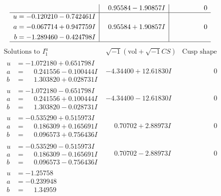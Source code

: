 \documentclass[1p]{elsarticle_modified}
\theoremstyle{definition}
\newcommand{\I}{\sqrt{-1}}
\begin{document}
$$\begin{array}{c|c|c}
 & \phantom{-}0.95584 - 1.90857 I & \phantom{-0.000000 } 0 \\ \hline\begin{aligned}
u &= -0.120210 - 0.742461 I \\
a &= -0.067714 + 0.947759 I \\
b &= -1.289460 - 0.424798 I\end{aligned}
 & \phantom{-}0.95584 + 1.90857 I & \phantom{-0.000000 } 0\\
 \hline 
 \end{array}$$\newpage$$\begin{array}{c|c|c}  
\text{Solutions to }I^u_{1}& \I (\text{vol} + \sqrt{-1}CS) & \text{Cusp shape}\\
 \hline 
\begin{aligned}
u &= -1.072180 + 0.651798 I \\
a &= \phantom{-}0.241556 - 0.100444 I \\
b &= \phantom{-}1.303820 + 0.028731 I\end{aligned}
 & -4.34400 + 12.61830 I & \phantom{-0.000000 } 0 \\ \hline\begin{aligned}
u &= -1.072180 - 0.651798 I \\
a &= \phantom{-}0.241556 + 0.100444 I \\
b &= \phantom{-}1.303820 - 0.028731 I\end{aligned}
 & -4.34400 - 12.61830 I & \phantom{-0.000000 } 0 \\ \hline\begin{aligned}
u &= -0.535290 + 0.515973 I \\
a &= \phantom{-}0.186309 + 0.165691 I \\
b &= \phantom{-}0.096573 + 0.756436 I\end{aligned}
 & \phantom{-}0.70702 + 2.88973 I & \phantom{-0.000000 } 0 \\ \hline\begin{aligned}
u &= -0.535290 - 0.515973 I \\
a &= \phantom{-}0.186309 - 0.165691 I \\
b &= \phantom{-}0.096573 - 0.756436 I\end{aligned}
 & \phantom{-}0.70702 - 2.88973 I & \phantom{-0.000000 } 0 \\ \hline\begin{aligned}
u &= -1.25758\phantom{ +0.000000I} \\
a &= -0.239948\phantom{ +0.000000I} \\
b &= \phantom{-}1.34959\phantom{ +0.000000I}\end{aligned}

\end{array}$$
\end{document}
